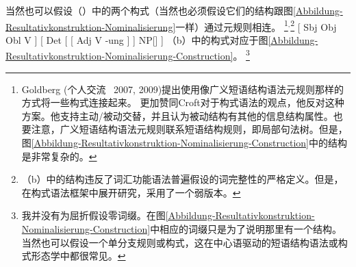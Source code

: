     当然也可以假设（）中的两个构式（当然也必须假设它们的结构跟图\ref{Abbildung-Resultativkonstruktion-Nominalisierung}一样）通过元规则相连。
\footnote{%
  Goldberg (个人交流 \, 2007, 2009)提出使用像广义短语结构语法元规则那样的方式将一些构式连接起来。 \citet[]{Deppermann2006a}更加赞同Croft对于构式语法的观点，他反对这种方案。他支持主动/被动交替，并且认为被动结构有其他的信息结构属性。也要注意，广义短语结构语法元规则联系短语结构规则，即局部句法树。但是，图\ref{Abbildung-Resultativkonstruktion-Nominalisierung-Construction}中的结构是非常复杂的。
}$^,$\footnote{%
（b）中的结构违反了词汇功能语法\indexlfg 普遍假设的词完整性的严格定义。但是， \citet{Booij2005a,Booij2009a}在构式语法\indexcxg 框架中展开研究，采用了一个弱版本。
}
\eal
\ex {}[ Sbj Obj Obl V ]
\ex {}[ Det [ [ Adj V -ung ] ] NP[] ]
\zl
（b）中的构式对应于图\vref{Abbildung-Resultativkonstruktion-Nominalisierung-Construction}。
\footnote{%
  我并没有为屈折假设零词缀。在图\ref{Abbildung-Resultativkonstruktion-Nominalisierung-Construction}中相应的词缀只是为了说明那里有一个结构。当然也可以假设一个单分支规则或构式，这在中心语驱动的短语结构语法或构式形态学中都很常见。
}
